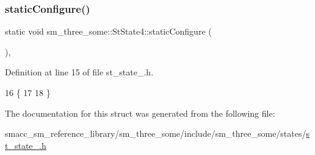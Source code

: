 \subsubsection{\texorpdfstring{static\+Configure()}{staticConfigure()}}
{\footnotesize\ttfamily static void sm\+\_\+three\+\_\+some\+::\+St\+State4\+::static\+Configure (\begin{DoxyParamCaption}{ }\end{DoxyParamCaption})\hspace{0.3cm}{\ttfamily [inline]}, {\ttfamily [static]}}



Definition at line 15 of file st\+\_\+state\+\_.\+h.


\begin{DoxyCode}
16     \{
17     
18     \}
\end{DoxyCode}


The documentation for this struct was generated from the following file\+:\begin{DoxyCompactItemize}
\item 
smacc\+\_\+sm\+\_\+reference\+\_\+library/sm\+\_\+three\+\_\+some/include/sm\+\_\+three\+\_\+some/states/\hyperlink{st__state__4_8h}{st\+\_\+state\+\_.\+h}\end{DoxyCompactItemize}
